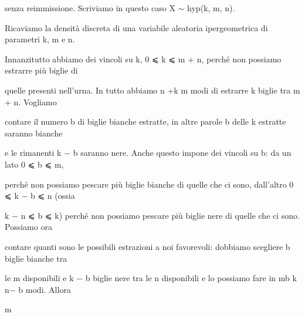\documentclass[a4paper,portrait,12pt]{article}
\begin{document}
\begin{flushleft}
senza reimmissione. Scriviamo in questo caso X $\sim$ hyp(k, m, n).
\end{flushleft}


\begin{flushleft}
Ricaviamo la densit\`{a} discreta di una variabile aleatoria ipergeometrica di parametri k, m e n.
\end{flushleft}


\begin{flushleft}
Innanzitutto abbiamo dei vincoli su k, 0 ⩽ k ⩽ m + n, perch\'{e} non possiamo estrarre più biglie di
\end{flushleft}


\begin{flushleft}
quelle presenti nell'urna. In tutto abbiamo n +k m modi di estrarre k biglie tra m + n. Vogliamo
\end{flushleft}


\begin{flushleft}
contare il numero b di biglie bianche estratte, in altre parole b delle k estratte saranno bianche
\end{flushleft}


\begin{flushleft}
e le rimanenti k $-$ b saranno nere. Anche questo impone dei vincoli su b: da un lato 0 ⩽ b ⩽ m,
\end{flushleft}


\begin{flushleft}
perch\'{e} non possiamo pescare più biglie bianche di quelle che ci sono, dall'altro 0 ⩽ k $-$ b ⩽ n (ossia
\end{flushleft}


\begin{flushleft}
k $-$ n ⩽ b ⩽ k) perch\'{e} non possiamo pescare più biglie nere di quelle che ci sono. Possiamo ora
\end{flushleft}


\begin{flushleft}
contare quanti sono le possibili estrazioni a noi favorevoli: dobbiamo scegliere b biglie bianche tra
\end{flushleft}


\begin{flushleft}
le m disponibili e k $-$ b biglie nere tra le n disponibili e lo possiamo fare in mb k n$-$ b modi. Allora
\end{flushleft}


\begin{flushleft}
m
\end{flushleft}
\end{document}
